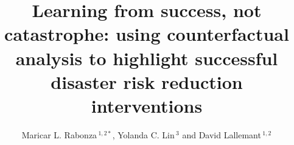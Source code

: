 \documentclass[utf8]{frontiersSCNS} %
\def\firstAuthorLast{Rabonza {et~al.}} %
\def\Authors{Maricar L. Rabonza\,$^{1,2*}$, Yolanda C. Lin\,$^{3}$ and David Lallemant\,$^{1,2}$}
\begin{document}
\onecolumn
{}

\title[]{Learning from success, not catastrophe: using counterfactual analysis to highlight successful disaster risk reduction interventions} 

\author[\firstAuthorLast ]{\Authors} %
\address{} %
\correspondance{} %
\extraAuth{}%
\maketitle
\end{document}
